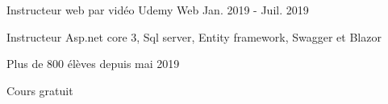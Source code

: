 

\begin{cventries}

  \cventry
    {Instructeur web par vidéo} %
    {Udemy} %
    {Web} %
    {Jan. 2019 - Juil. 2019} %
    {
      \begin{cvitems} %
        \item {Instructeur Asp.net core 3, Sql server, Entity framework, Swagger et Blazor}
        \item {Plus de 800 élèves depuis mai 2019}
        \item {Cours gratuit}
      \end{cvitems}
    }

\end{cventries}
